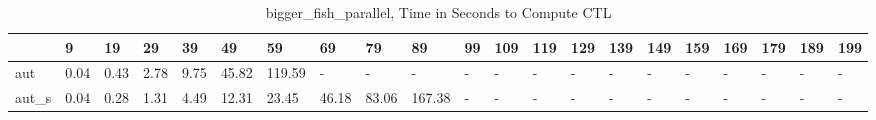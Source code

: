 \begin{table}
\centering
\caption{bigger_fish_parallel, Time in Seconds to Compute CTL}
\label{bigger_fish_parallel_CTL_time}
\begin{tabular}{lllllllllllllllllllll}
\toprule
{} &     9 &    19 &    29 &    39 &     49 &      59 &     69 &     79 &      89 & 99 & 109 & 119 & 129 & 139 & 149 & 159 & 169 & 179 & 189 & 199 \\
\midrule
aut   &  0.04 &  0.43 &  2.78 &  9.75 &  45.82 &  119.59 &      - &      - &       - &  - &   - &   - &   - &   - &   - &   - &   - &   - &   - &   - \\
aut\_s &  0.04 &  0.28 &  1.31 &  4.49 &  12.31 &   23.45 &  46.18 &  83.06 &  167.38 &  - &   - &   - &   - &   - &   - &   - &   - &   - &   - &   - \\
\bottomrule
\end{tabular}
\end{table}
